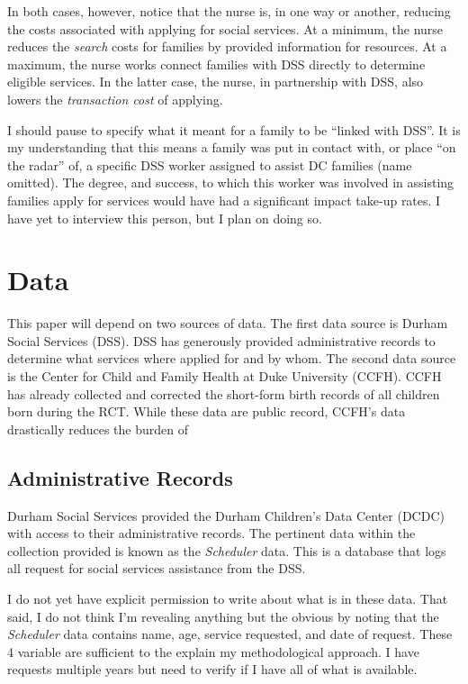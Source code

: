 \documentclass[12pt,letterpaperpaper,]{book}
\begin{document}
In both cases, however, notice that the nurse is, in one way or another,
reducing the costs associated with applying for social services. At a
minimum, the nurse reduces the \emph{search} costs for families by
provided information for resources. At a maximum, the nurse works
connect families with DSS directly to determine eligible services. In
the latter case, the nurse, in partnership with DSS, also lowers the
\emph{transaction cost} of applying.

I should pause to specify what it meant for a family to be ``linked with
DSS''. It is my understanding that this means a family was put in
contact with, or place ``on the radar'' of, a specific DSS worker
assigned to assist DC families (name omitted). The degree, and success,
to which this worker was involved in assisting families apply for
services would have had a significant impact take-up rates. I have yet
to interview this person, but I plan on doing so.

\section*{Data}\label{data-2}

This paper will depend on two sources of data. The first data source is
Durham Social Services (DSS). DSS has generously provided administrative
records to determine what services where applied for and by whom. The
second data source is the Center for Child and Family Health at Duke
University (CCFH). CCFH has already collected and corrected the
short-form birth records of all children born during the RCT. While
these data are public record, CCFH's data drastically reduces the burden
of

\subsection*{Administrative Records}\label{administrative-records}

Durham Social Services provided the Durham Children's Data Center (DCDC)
with access to their administrative records. The pertinent data within
the collection provided is known as the \emph{Scheduler} data. This is a
database that logs all request for social services assistance from the
DSS.

I do not yet have explicit permission to write about what is in these
data. That said, I do not think I'm revealing anything but the obvious
by noting that the \emph{Scheduler} data contains name, age, service
requested, and date of request. These 4 variable are sufficient to the
explain my methodological approach. I have requests multiple years but
need to verify if I have all of what is available.
\end{document}
